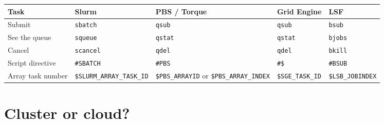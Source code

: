 {\def\LTcaptype{none} %
\begin{longtable}[]{@{}
  >{\raggedright\arraybackslash}p{}
  >{\raggedright\arraybackslash}p{}
  >{\raggedright\arraybackslash}p{}
  >{\raggedright\arraybackslash}p{}
  >{\raggedright\arraybackslash}p{}@{}}
\toprule\noalign{}
\begin{minipage}[b]{\linewidth}\raggedright
Task
\end{minipage} & \begin{minipage}[b]{\linewidth}\raggedright
Slurm
\end{minipage} & \begin{minipage}[b]{\linewidth}\raggedright
PBS / Torque
\end{minipage} & \begin{minipage}[b]{\linewidth}\raggedright
Grid Engine
\end{minipage} & \begin{minipage}[b]{\linewidth}\raggedright
LSF
\end{minipage} \\
\midrule\noalign{}
\endhead
\bottomrule\noalign{}
\endlastfoot
Submit & \texttt{sbatch} & \texttt{qsub} & \texttt{qsub} & \texttt{bsub} \\
See the queue & \texttt{squeue} & \texttt{qstat} & \texttt{qstat} & \texttt{bjobs} \\
Cancel & \texttt{scancel} & \texttt{qdel} & \texttt{qdel} & \texttt{bkill} \\
Script directive & \texttt{\#SBATCH} & \texttt{\#PBS} & \texttt{\#\$} & \texttt{\#BSUB} \\
Array task number & \texttt{\$SLURM\_ARRAY\_TASK\_ID} & \texttt{\$PBS\_ARRAYID} or \texttt{\$PBS\_ARRAY\_INDEX} & \texttt{\$SGE\_TASK\_ID} & \texttt{\$LSB\_JOBINDEX} \\
\end{longtable}
}

\section{Cluster or cloud?}\label{cluster-or-cloud}

